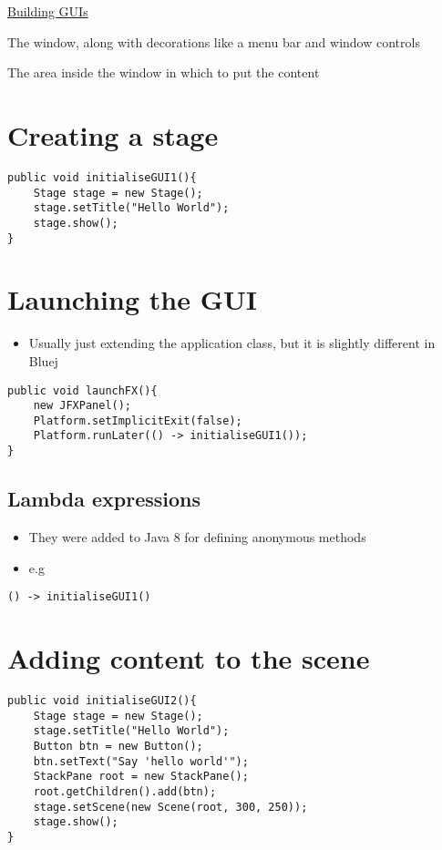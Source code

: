 \documentclass{article}[18pt]
\begin{document}
\begin{center}
\underline{\huge Building GUIs}
\end{center}
\begin{definition}[Stage]
The window, along with decorations like a menu bar and window controls
\end{definition}
\begin{definition}[Scene]
The area inside the window in which to put the content
\end{definition}
\section{Creating a stage}
\begin{verbatim}
public void initialiseGUI1(){
	Stage stage = new Stage();
	stage.setTitle("Hello World");
	stage.show();
}
\end{verbatim}
\section{Launching the GUI}
\begin{itemize}
	\item Usually just extending the application class, but it is slightly different in Bluej
\end{itemize}
\begin{verbatim}
public void launchFX(){
	new JFXPanel();
	Platform.setImplicitExit(false);
	Platform.runLater(() -> initialiseGUI1());
}
\end{verbatim}
\subsection{Lambda expressions}
\begin{itemize}
	\item They were added to Java 8 for defining anonymous methods
	\item e.g
\end{itemize}
\begin{verbatim}
() -> initialiseGUI1()
\end{verbatim}
\section{Adding content to the scene}
\begin{verbatim}
public void initialiseGUI2(){
	Stage stage = new Stage();
	stage.setTitle("Hello World");
	Button btn = new Button();
	btn.setText("Say 'hello world'");
	StackPane root = new StackPane(); 
	root.getChildren().add(btn);
	stage.setScene(new Scene(root, 300, 250));
	stage.show();
}
\end{verbatim}
\end{document}
